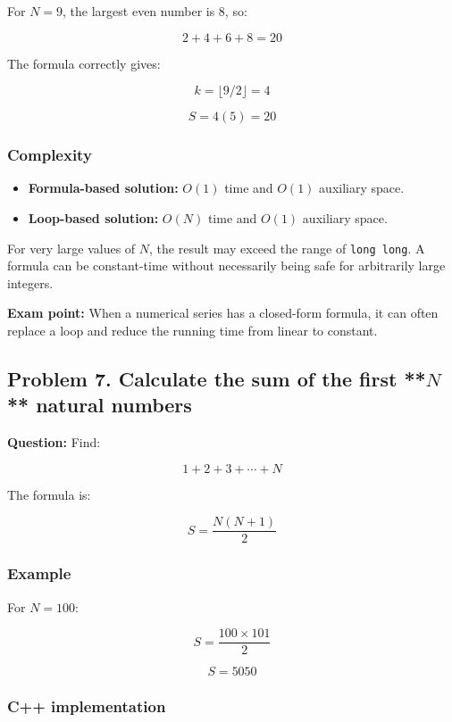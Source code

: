 For $N=9$, the largest even number is 8, so:


\[
2+4+6+8=20
\]


The formula correctly gives:


\[
k=\lfloor9/2\rfloor=4
\]



\[
S=4(5)=20
\]


\subsubsection{Complexity}

\begin{itemize}
    \item \textbf{Formula-based solution:} $O(1)$ time and $O(1)$ auxiliary space.
    \item \textbf{Loop-based solution:} $O(N)$ time and $O(1)$ auxiliary space.
\end{itemize}

For very large values of $N$, the result may exceed the range of \texttt{long long}. A formula can be constant-time without necessarily being safe for arbitrarily large integers.

\textbf{Exam point:} When a numerical series has a closed-form formula, it can often replace a loop and reduce the running time from linear to constant.

\subsection{Problem 7. Calculate the sum of the first **$N$** natural numbers}

\textbf{Question:} Find:


\[
1+2+3+\cdots+N
\]


The formula is:


\[
\boxed{S=\frac{N(N+1)}2}
\]


\subsubsection{Example}

For $N=100$:


\[
S=\frac{100\times101}{2}
\]



\[
\boxed{S=5050}
\]


\subsubsection{C++ implementation}

